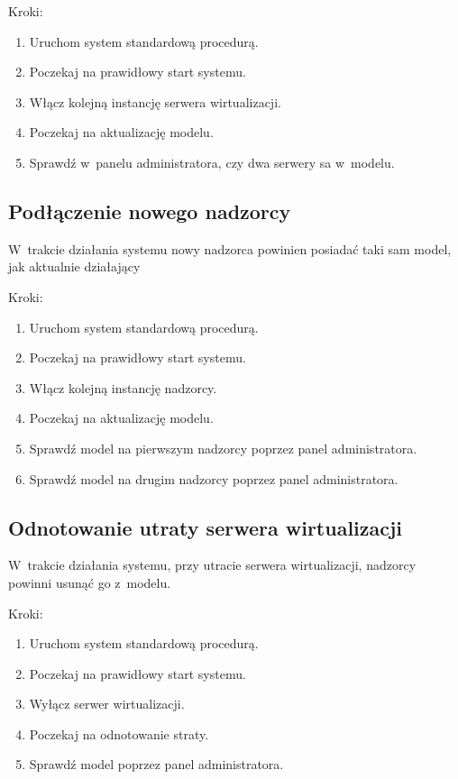 \documentclass[../analiza-rozwiazania.tex]{subfiles}
\begin{document}
Kroki:
\begin{enumerate}
  \item Uruchom system standardową procedurą.
  \item Poczekaj na prawidłowy start systemu.
  \item Włącz kolejną instancję serwera wirtualizacji.
  \item Poczekaj na aktualizację modelu.
  \item Sprawdź w~panelu administratora, czy dwa serwery sa w~modelu.
\end{enumerate}

\subsection{Podłączenie nowego nadzorcy}
W~trakcie działania systemu nowy nadzorca powinien posiadać taki sam model, jak aktualnie działający

Kroki:
\begin{enumerate}
  \item Uruchom system standardową procedurą.
  \item Poczekaj na prawidłowy start systemu.
  \item Włącz kolejną instancję nadzorcy.
  \item Poczekaj na aktualizację modelu.
  \item Sprawdź model na pierwszym nadzorcy poprzez panel administratora.
  \item Sprawdź model na drugim nadzorcy poprzez panel administratora.
\end{enumerate}

\subsection{Odnotowanie utraty serwera wirtualizacji}
W~trakcie działania systemu, przy utracie serwera wirtualizacji, nadzorcy powinni usunąć go z~modelu.

Kroki:
\begin{enumerate}
  \item Uruchom system standardową procedurą.
  \item Poczekaj na prawidłowy start systemu.
  \item Wyłącz serwer wirtualizacji.
  \item Poczekaj na odnotowanie straty.
  \item Sprawdź model poprzez panel administratora.
\end{enumerate}
\end{document}
